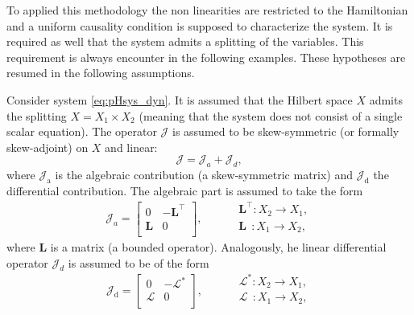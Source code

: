 To applied this methodology the non linearities are restricted to the Hamiltonian and a uniform causality condition is supposed to characterize the system. It is required as well that the system admits a splitting of the variables. This requirement is always encounter in the following examples. These hypotheses are resumed in the following assumptions.

\begin{assumption}\label{ass:linJ}
	Consider system \eqref{eq:pHsys_dyn}. It is assumed that the Hilbert space $X$ admits the splitting $X = X_1 \times X_2$ (meaning that the system does not consist of a single scalar equation). The operator $\mathcal{J}$ is assumed to be skew-symmetric (or formally skew-adjoint) on $X$ and linear:
	\begin{equation}\label{eq:assJ}
	\mathcal{J} = \mathcal{J}_{{a}} + \mathcal{J}_{{d}},
	\end{equation}
	where $\mathcal{J}_{\text{a}}$ is the algebraic contribution (a skew-symmetric matrix) and $\mathcal{J}_{\text{d}}$ the differential contribution. The algebraic part is assumed to take the form
	\begin{equation}\label{eq:assJa}
		\mathcal{J}_{{a}} = \begin{bmatrix}
		0 & -\bm{L}^\top \\
		\bm{L} & 0 \\
		\end{bmatrix}, \qquad 
		\begin{aligned}
		&\bm{L}^\top : X_2 \rightarrow X_1, \\
		&\bm{L}\;\, : X_1 \rightarrow X_2, \\
		\end{aligned}
	\end{equation}
	where $\bm{L}$ is a matrix (a bounded operator). 	Analogously, he linear differential operator $\mathcal{J}_{{d}}$ is assumed to be of the form
	\begin{equation}\label{eq:assJd}
	\mathcal{J}_{\text{d}} = 
	\begin{bmatrix}
	0 & -\mathcal{L}^* \\
	\mathcal{L} & 0 \\
	\end{bmatrix}, \qquad 
	\begin{aligned}
	&\mathcal{L}^* : X_2 \rightarrow X_1, \\
	&\mathcal{L}\;\, : X_1 \rightarrow X_2, \\
	\end{aligned}
	\end{equation}

\end{assumption}
